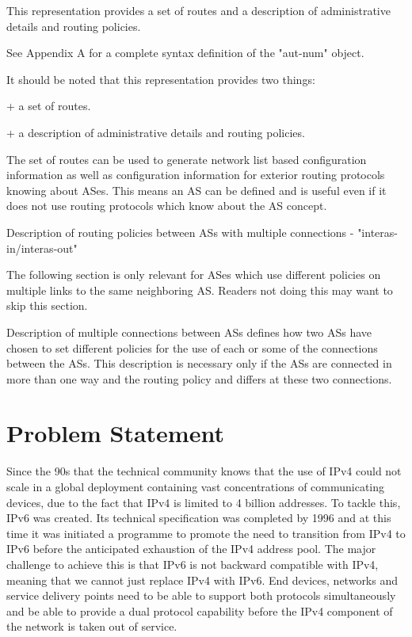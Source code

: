 \documentclass[11pt,a4paper]{scrreprt}
\begin{document}
This representation provides a set of routes and a description of administrative details and routing policies. 
        
        
          
          
          
          


	See Appendix A for a complete syntax definition of the "aut-num"
   object.


   It should be noted that this representation provides two things:

       + a set of routes.

       + a description of administrative details and routing policies.

   The set of routes can be used to generate network list based
   configuration information as well as configuration information for
   exterior routing protocols knowing about ASes. This means an AS can
   be defined and is useful even if it does not use routing protocols
   which know about the AS concept.

   Description of routing policies between ASs with multiple connections
   - "interas-in/interas-out"

   The following section is only relevant for ASes which use different
   policies on multiple links to the same neighboring AS. Readers not
   doing this may want to skip this section.

   Description of multiple connections between ASs defines how two ASs
   have chosen to set different policies for the use of each or some of
   the connections between the ASs.  This description is necessary only
   if the ASs are connected in more than one way and the routing policy
   and differs at these two connections.

\chapter{Problem Statement}

Since the 90s that the technical community knows that the use of IPv4 could not scale in a global deployment containing vast concentrations of communicating devices, due to the fact that IPv4 is limited to 4 billion addresses. To tackle this, IPv6 was created. Its technical specification was completed by 1996 and at this time it was initiated a programme to promote the need to transition from IPv4 to IPv6 before the anticipated exhaustion of the IPv4 address pool. The major challenge to achieve this is that IPv6 is not backward compatible with IPv4, meaning that we cannot just replace IPv4 with IPv6. End devices, networks and service delivery points need to be able to support both protocols simultaneously and be able to provide a dual protocol capability before the IPv4 component of the network is taken out of service.     
\end{document}
